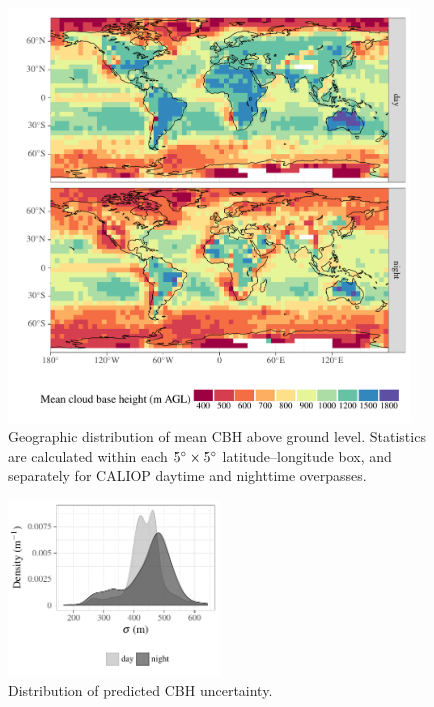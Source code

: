 \documentclass[essd,manuscript]{copernicus}\usepackage[]{graphicx}\usepackage[]{color}
\newenvironment{knitrout}{}{} %
\begin{document}
\begin{figure}
  \centering
\begin{knitrout}
\color{fgcolor}

{\centering \includegraphics[width=0.95\textwidth]{figure/method-cbase-base-1} 

}



\end{knitrout}
  \caption{Geographic distribution of mean CBH above ground
    level.  Statistics are calculated within each $5^{\circ}\times 5^{\circ}$
    latitude--longitude box, and separately for CALIOP daytime and nighttime
    overpasses.}
  \label{fig:geo}
\end{figure}

\begin{figure}
  \centering
\begin{knitrout}
\color{fgcolor}

{\centering \includegraphics[width=0.5\textwidth]{figure/method-cbase-rmse-1} 

}



\end{knitrout}
  \caption{Distribution of predicted CBH uncertainty.}
  \label{fig:uncertainty}
\end{figure}
\end{document}
